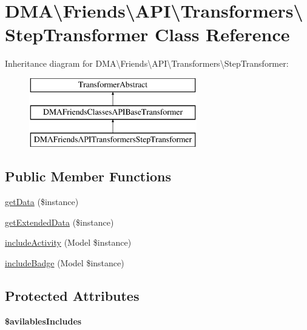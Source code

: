 \hypertarget{classDMA_1_1Friends_1_1API_1_1Transformers_1_1StepTransformer}{}\section{D\+M\+A\textbackslash{}Friends\textbackslash{}A\+P\+I\textbackslash{}Transformers\textbackslash{}Step\+Transformer Class Reference}
\label{classDMA_1_1Friends_1_1API_1_1Transformers_1_1StepTransformer}
Inheritance diagram for D\+M\+A\textbackslash{}Friends\textbackslash{}A\+P\+I\textbackslash{}Transformers\textbackslash{}Step\+Transformer\+:\begin{figure}[H]
\begin{center}
\leavevmode
\includegraphics[height=3.000000cm]{de/d3c/classDMA_1_1Friends_1_1API_1_1Transformers_1_1StepTransformer}
\end{center}
\end{figure}
\subsection*{Public Member Functions}
\begin{DoxyCompactItemize}
\item 
\hyperlink{classDMA_1_1Friends_1_1API_1_1Transformers_1_1StepTransformer_af598033e757246e05cb07b0e9256ef20}{get\+Data} (\$instance)
\item 
\hyperlink{classDMA_1_1Friends_1_1API_1_1Transformers_1_1StepTransformer_aa09dd3be3937396f320a2d7827537818}{get\+Extended\+Data} (\$instance)
\item 
\hyperlink{classDMA_1_1Friends_1_1API_1_1Transformers_1_1StepTransformer_a8052fad1a0585b225720e12f619e01cf}{include\+Activity} (Model \$instance)
\item 
\hyperlink{classDMA_1_1Friends_1_1API_1_1Transformers_1_1StepTransformer_a5658c6eb2bff831cd21c37037b3b4978}{include\+Badge} (Model \$instance)
\end{DoxyCompactItemize}
\subsection*{Protected Attributes}
\begin{DoxyCompactItemize}
\item 
{\bfseries \$avilables\+Includes}
\end{DoxyCompactItemize}
